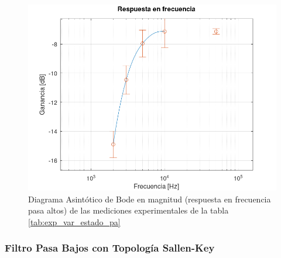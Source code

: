 \begin{itemize}
             \begin{figure}[H]
                \centering
                \renewcommand{\figurename}{Gráfica}
                \setcounter{figure}{39}
                \includegraphics[width=15cm]{Imagenes/resp_frec_var_estado_pa.png}
                \caption{Diagrama  Asintótico de Bode en magnitud (respuesta en frecuencia pasa altos) de las mediciones experimentales de la tabla \ref{tab:exp_var_estado_pa}}
                \label{fig:resp_frec_var_estado_pa}
            \end{figure}

          \end{itemize}

        \subsubsection{Filtro Pasa Bajos con Topología Sallen-Key}

